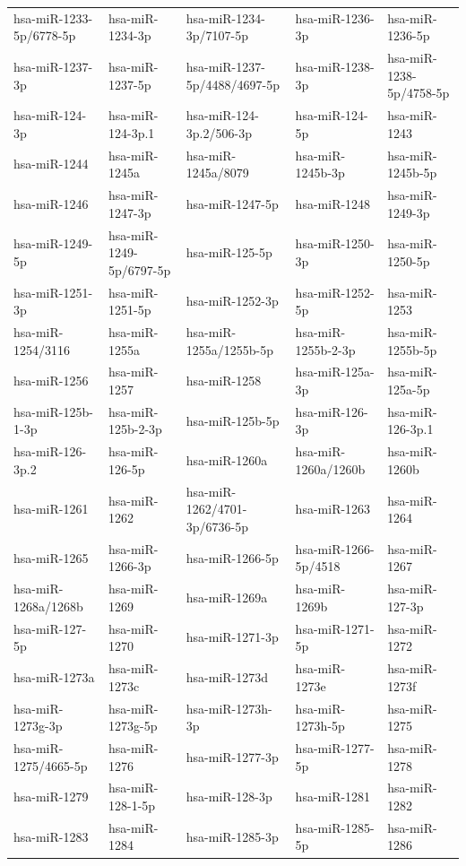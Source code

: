 \begin{longtable}{lllll}
hsa-miR-1233-5p/6778-5p & hsa-miR-1234-3p & hsa-miR-1234-3p/7107-5p & hsa-miR-1236-3p & hsa-miR-1236-5p \\
hsa-miR-1237-3p & hsa-miR-1237-5p & hsa-miR-1237-5p/4488/4697-5p & hsa-miR-1238-3p & hsa-miR-1238-5p/4758-5p \\
hsa-miR-124-3p & hsa-miR-124-3p.1 & hsa-miR-124-3p.2/506-3p & hsa-miR-124-5p & hsa-miR-1243 \\
hsa-miR-1244 & hsa-miR-1245a & hsa-miR-1245a/8079 & hsa-miR-1245b-3p & hsa-miR-1245b-5p \\
hsa-miR-1246 & hsa-miR-1247-3p & hsa-miR-1247-5p & hsa-miR-1248 & hsa-miR-1249-3p \\
hsa-miR-1249-5p & hsa-miR-1249-5p/6797-5p & hsa-miR-125-5p & hsa-miR-1250-3p & hsa-miR-1250-5p \\
hsa-miR-1251-3p & hsa-miR-1251-5p & hsa-miR-1252-3p & hsa-miR-1252-5p & hsa-miR-1253 \\
hsa-miR-1254/3116 & hsa-miR-1255a & hsa-miR-1255a/1255b-5p & hsa-miR-1255b-2-3p & hsa-miR-1255b-5p \\
hsa-miR-1256 & hsa-miR-1257 & hsa-miR-1258 & hsa-miR-125a-3p & hsa-miR-125a-5p \\
hsa-miR-125b-1-3p & hsa-miR-125b-2-3p & hsa-miR-125b-5p & hsa-miR-126-3p & hsa-miR-126-3p.1 \\
hsa-miR-126-3p.2 & hsa-miR-126-5p & hsa-miR-1260a & hsa-miR-1260a/1260b & hsa-miR-1260b \\
hsa-miR-1261 & hsa-miR-1262 & hsa-miR-1262/4701-3p/6736-5p & hsa-miR-1263 & hsa-miR-1264 \\
hsa-miR-1265 & hsa-miR-1266-3p & hsa-miR-1266-5p & hsa-miR-1266-5p/4518 & hsa-miR-1267 \\
hsa-miR-1268a/1268b & hsa-miR-1269 & hsa-miR-1269a & hsa-miR-1269b & hsa-miR-127-3p \\
hsa-miR-127-5p & hsa-miR-1270 & hsa-miR-1271-3p & hsa-miR-1271-5p & hsa-miR-1272 \\
hsa-miR-1273a & hsa-miR-1273c & hsa-miR-1273d & hsa-miR-1273e & hsa-miR-1273f \\
hsa-miR-1273g-3p & hsa-miR-1273g-5p & hsa-miR-1273h-3p & hsa-miR-1273h-5p & hsa-miR-1275 \\
hsa-miR-1275/4665-5p & hsa-miR-1276 & hsa-miR-1277-3p & hsa-miR-1277-5p & hsa-miR-1278 \\
hsa-miR-1279 & hsa-miR-128-1-5p & hsa-miR-128-3p & hsa-miR-1281 & hsa-miR-1282 \\
hsa-miR-1283 & hsa-miR-1284 & hsa-miR-1285-3p & hsa-miR-1285-5p & hsa-miR-1286 \\

\end{longtable}
